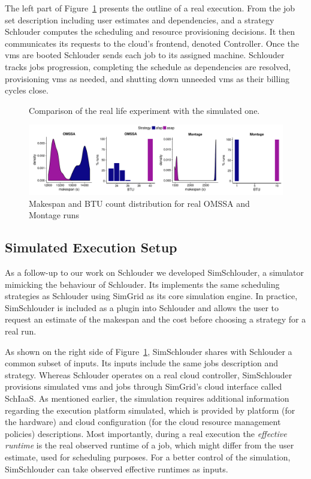 \documentclass[10pt,conference,compsocconf]{IEEEtran}
\begin{document}
The left part  of Figure~\ref{fig:rs} presents the outline of  a real execution.
From the  job set description including  user estimates and dependencies,  and a
strategy   Schlouder  computes   the   scheduling   and  resource   provisioning
decisions. It  then communicates its  requests to the cloud's  frontend, denoted
Controller.   Once the  \acp{vm}  are booted  Schlouder sends  each  job to  its
assigned machine.  Schlouder tracks jobs progression, completing the schedule as
dependencies are  resolved, provisioning \acp{vm}  as needed, and  shutting down
unneeded \acp{vm} as their billing cycles close.

\begin{figure}
	\resizebox{0.5\textwidth}{!}{%
		
		
	}%
	\caption{Comparison of the real life experiment with the
	simulated one.}\label{fig:rs}
\end{figure}
\begin{figure}
	\centering
	\includegraphics[width=\textwidth]{gfx/real_plot.pdf}
	\caption{Makespan and BTU count distribution for real OMSSA and Montage
	runs\label{fig:realbrs}}
\end{figure}

\subsection{Simulated Execution Setup}
As a follow-up  to our work on Schlouder we  developed SimSchlouder, a simulator
mimicking  the  behaviour  of  Schlouder. Its  implements  the  same  scheduling
strategies  as  Schlouder  using  SimGrid  as its  core  simulation  engine.  In
practice, SimSchlouder  is included as  a plugin  into Schlouder and  allows the
user to request an estimate of the makespan and the  cost before choosing a
strategy for a real run.

As  shown on  the right  side of  Figure~\ref{fig:rs}, SimSchlouder  shares with
Schlouder  a common  subset of  inputs.   Its inputs  include the  same jobs
description  and  strategy.    Whereas  Schlouder  operates  on   a  real  cloud
controller,  SimSchlouder   provisions  simulated  \acp{vm}  and   jobs  through
SimGrid's cloud interface  called SchIaaS. As mentioned  earlier, the simulation
requires  additional information  regarding  the  execution platform  simulated,
which is  provided by platform (for  the hardware) and cloud  configuration (for
the cloud resource management  policies) descriptions.  Most importantly, during
a real execution the \emph{effective runtime}  is the real observed runtime of a
job,  which   might  differ  from   the  user  estimate,  used   for  scheduling
purposes. For a better control of the simulation, SimSchlouder can take observed
effective runtimes as inputs.
\end{document}
